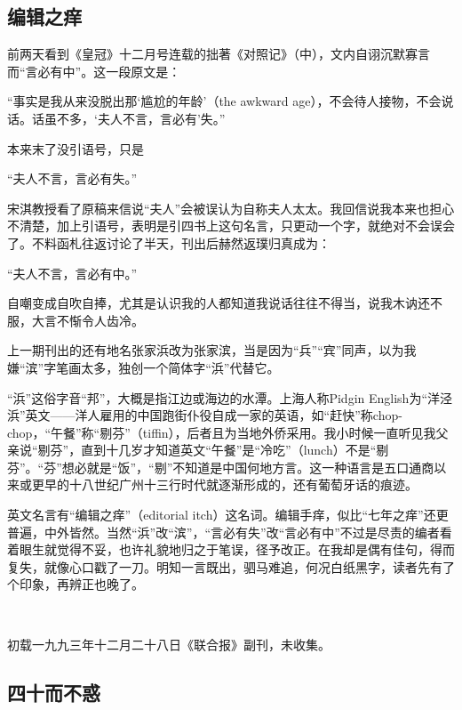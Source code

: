 \subsection{编辑之痒}


\par 前两天看到《皇冠》十二月号连载的拙著《对照记》（中），文内自诩沉默寡言而“言必有中”。这一段原文是：
\par “事实是我从来没脱出那‘尴尬的年龄’（the awkward age），不会待人接物，不会说话。话虽不多，‘夫人不言，言必有’失。”
\par 本来末了没引语号，只是
\par “夫人不言，言必有失。”
\par 宋淇教授看了原稿来信说“夫人”会被误认为自称夫人太太。我回信说我本来也担心不清楚，加上引语号，表明是引四书上这句名言，只更动一个字，就绝对不会误会了。不料函札往返讨论了半天，刊出后赫然返璞归真成为：
\par “夫人不言，言必有中。”
\par 自嘲变成自吹自捧，尤其是认识我的人都知道我说话往往不得当，说我木讷还不服，大言不惭令人齿冷。
\par 上一期刊出的还有地名张家浜改为张家滨，当是因为“兵”“宾”同声，以为我嫌“滨”字笔画太多，独创一个简体字“浜”代替它。
\par “浜”这俗字音“邦”，大概是指江边或海边的水潭。上海人称Pidgin English为“洋泾浜”英文——洋人雇用的中国跑街仆役自成一家的英语，如“赶快”称chop-chop，“午餐”称“剔芬”（tiffin），后者且为当地外侨采用。我小时候一直听见我父亲说“剔芬”，直到十几岁才知道英文“午餐”是“冷吃”（lunch）不是“剔芬”。“芬”想必就是“饭”，“剔”不知道是中国何地方言。这一种语言是五口通商以来或更早的十八世纪广州十三行时代就逐渐形成的，还有葡萄牙话的痕迹。
\par 英文名言有“编辑之痒”（editorial itch）这名词。编辑手痒，似比“七年之痒”还更普遍，中外皆然。当然“浜”改“滨”，“言必有失”改“言必有中”不过是尽责的编者看着眼生就觉得不妥，也许礼貌地归之于笔误，径予改正。在我却是偶有佳句，得而复失，就像心口戳了一刀。明知一言既出，驷马难追，何况白纸黑字，读者先有了个印象，再辨正也晚了。
\par  
\par *初载一九九三年十二月二十八日《联合报》副刊，未收集。



\subsection{四十而不惑}



